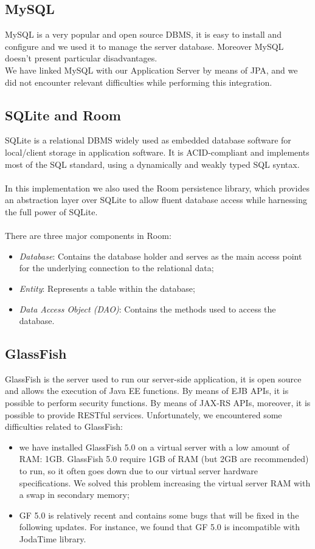 \subsection{MySQL}
\label{subsec:Middleware}
MySQL is a very popular and open source DBMS, it is easy to install and configure and we used it to manage the server database. Moreover MySQL doesn't present particular disadvantages.\\
We have linked MySQL with our Application Server by means of JPA, and we did not encounter relevant difficulties while performing this integration.

\subsection{SQLite and Room}
\label{subsec:SQLite and Room}
SQLite is a relational DBMS widely used as embedded database software for local/client storage in application software. It is ACID-compliant and implements most of the SQL standard, using a dynamically and weakly typed SQL syntax. \\\\
In this implementation we also used the Room persistence library, which provides an abstraction layer over SQLite to allow fluent database access while harnessing the full power of SQLite. \\\\
There are three major components in Room:
\begin{itemize}
\item \textit{Database}: Contains the database holder and serves as the main access point for the underlying connection to the relational data;
\item \textit{Entity}: Represents a table within the database;
\item \textit{Data Access Object (DAO)}: Contains the methods used to access the database.
\end{itemize}

\subsection{GlassFish}
\label{subsec:GlassFish}
GlassFish is the server used to run our server-side application, it is open source and allows the execution of Java EE functions. By means of EJB APIs, it is possible to perform security functions. 
By means of JAX-RS APIs, moreover, it is possible to provide RESTful services. 
Unfortunately, we encountered some difficulties related to GlassFish:
\begin{itemize}
\item we have installed GlassFish 5.0 on a virtual server with a low amount of RAM: 1GB. GlassFish 5.0 require 1GB of RAM (but 2GB are recommended) to run, so it often goes down due to our virtual server hardware specifications. We solved this problem increasing the virtual server RAM with a swap in secondary memory;
\item GF 5.0 is relatively recent and contains some bugs that will be fixed in the following updates. For instance, we found that GF 5.0 is incompatible with JodaTime library.
\end{itemize}